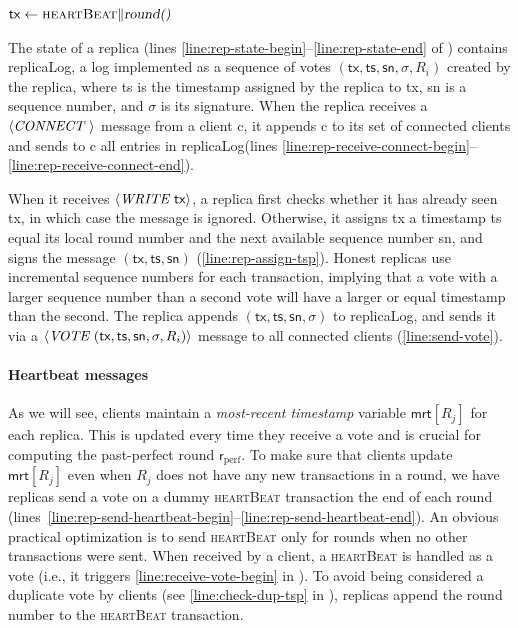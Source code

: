 \documentclass[pdflatex,sn-mathphys-num]{sn-jnl}%
\theoremstyle{thmstyleone}%
\theoremstyle{thmstyletwo}%
\theoremstyle{thmstylethree}%
\def\Let#1#2{\State $#1\gets#2$}
\def\Let#1#2{\State $#1\gets#2$}
\newcommand{\op}[1]{\textsl{#1}}
\newcommand{\opSendVote}[1]{\op{doVote}(#1)\xspace}
\newcommand{\opTime}{\op{round()}\xspace}
\newcommand{\operand}[1]{\textsf{#1}}
\newcommand{\tx}{\operand{tx}\xspace}
\newcommand{\round}{\operand{r}\xspace}
\newcommand{\client}{\operand{c}\xspace}
\newcommand{\heartBeat}{\textsc{heartBeat}\xspace}
\newcommand{\rperf}{\ensuremath{\round_\text{perf}}\xspace}
\newcommand{\rep}{\ensuremath{R}\xspace}
\newcommand{\mrt}{\operand{mrt}\xspace}
\newcommand{\repLog}{\operand{replicaLog}\xspace}
\newcommand{\tsp}{\operand{ts}\xspace}
\newcommand{\dotparagraph}[1]{\paragraph*{#1}}
\newcommand{\msg}[2]{\ensuremath{\langle\textit{\uppercase{#1 }}#2\rangle}\xspace}
\newcommand{\msgwrite}[1]{\msg{write}{ #1}}
\newcommand{\msgconnect}{\msg{connect}{}}
\newcommand{\msgrecord}[1]{\msg{vote}{ #1}}
\newcommand{\sig}{\ensuremath{\sigma}\xspace}
\newcommand{\sn}{\operand{sn}\xspace}
\begin{document}
\begin{algorithm}[ht!]
\begin{algorithmic}[1]
        \vspace{-1mm}
         \label{line:rep-send-heartbeat-begin}                      
            \Let{\tx}{\heartBeat \| \opTime}
            \State{\opSendVote{\tx}}\label{line:rep-send-vote-heartbeat}
        \EndOn\label{line:rep-send-heartbeat-end}
    \end{algorithmic}
    \end{algorithm}

The state of a replica (lines \ref{line:rep-state-begin}--\ref{line:rep-state-end} of ) contains \repLog, a log implemented as a sequence of votes $(\tx, \tsp, \sn, \sigma, \rep_i)$ created by the replica, where \tsp is the timestamp assigned by the replica to \tx, \sn is a sequence number, and \sig is its signature.
When the replica receives a \msgconnect{} message from a client \client, it appends \client to its set of connected clients and sends to \client all entries in \repLog (lines \ref{line:rep-receive-connect-begin}--\ref{line:rep-receive-connect-end}).

When it receives  \msgwrite{\tx}, a replica first checks whether it has already seen \tx, in which case the message is ignored. Otherwise, it assigns \tx a timestamp \tsp equal its local round number and the next available sequence number \sn, and signs the message $(\tx, \tsp, \sn)$ (\cref{line:rep-assign-tsp}).
Honest replicas use incremental sequence numbers for each transaction, implying that a vote with a larger sequence number than a second vote will have a larger or equal timestamp than the second.
The replica appends $(\tx, \tsp, \sn, \sig)$ to \repLog, and sends it via a \msgrecord{(\tx, \tsp, \sn, \sig, \rep_i)} message to all connected clients (\cref{line:send-vote}).

\dotparagraph{Heartbeat messages}
As we will see, clients maintain a \emph{most-recent timestamp} variable $\mrt[\rep_j]$ for each replica. This is updated every time they receive a vote and is crucial for computing the past-perfect round \rperf.
To make sure that clients update $\mrt[\rep_j]$ even when $\rep_j$ does not have any new transactions in a round,
we have replicas send a vote on a dummy \heartBeat transaction the end of each round (lines~\ref{line:rep-send-heartbeat-begin}--\ref{line:rep-send-heartbeat-end}).
An obvious practical optimization is to send \heartBeat only for rounds when no other transactions were sent.
When received by a client, a \heartBeat is handled as a vote (i.e., it triggers \cref{line:receive-vote-begin} in ). To avoid being considered a duplicate vote by clients (see \cref{line:check-dup-tsp} in ), replicas append the round number to the \heartBeat transaction.
\end{document}
